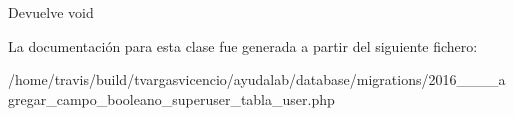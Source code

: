 \begin{DoxyReturn}{\-Devuelve}
void 
\end{DoxyReturn}


\-La documentación para esta clase fue generada a partir del siguiente fichero\-:\begin{DoxyCompactItemize}
\item 
/home/travis/build/tvargasvicencio/ayudalab/database/migrations/2016\-\_\-\_\-\_\-\_\-agregar\-\_\-campo\-\_\-booleano\-\_\-superuser\-\_\-tabla\-\_\-user.\-php\end{DoxyCompactItemize}

